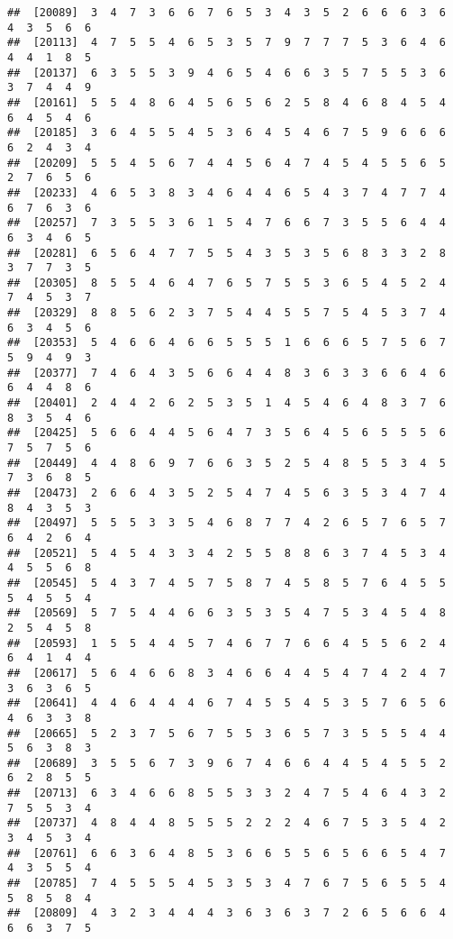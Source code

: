 \documentclass[
]{book}
\begin{document}
\begin{verbatim}
##  [20089]  3  4  7  3  6  6  7  6  5  3  4  3  5  2  6  6  6  3  6  4  3  5  6  6
##  [20113]  4  7  5  5  4  6  5  3  5  7  9  7  7  7  5  3  6  4  6  4  4  1  8  5
##  [20137]  6  3  5  5  3  9  4  6  5  4  6  6  3  5  7  5  5  3  6  3  7  4  4  9
##  [20161]  5  5  4  8  6  4  5  6  5  6  2  5  8  4  6  8  4  5  4  6  4  5  4  6
##  [20185]  3  6  4  5  5  4  5  3  6  4  5  4  6  7  5  9  6  6  6  6  2  4  3  4
##  [20209]  5  5  4  5  6  7  4  4  5  6  4  7  4  5  4  5  5  6  5  2  7  6  5  6
##  [20233]  4  6  5  3  8  3  4  6  4  4  6  5  4  3  7  4  7  7  4  6  7  6  3  6
##  [20257]  7  3  5  5  3  6  1  5  4  7  6  6  7  3  5  5  6  4  4  6  3  4  6  5
##  [20281]  6  5  6  4  7  7  5  5  4  3  5  3  5  6  8  3  3  2  8  3  7  7  3  5
##  [20305]  8  5  5  4  6  4  7  6  5  7  5  5  3  6  5  4  5  2  4  7  4  5  3  7
##  [20329]  8  8  5  6  2  3  7  5  4  4  5  5  7  5  4  5  3  7  4  6  3  4  5  6
##  [20353]  5  4  6  6  4  6  6  5  5  5  1  6  6  6  5  7  5  6  7  5  9  4  9  3
##  [20377]  7  4  6  4  3  5  6  6  4  4  8  3  6  3  3  6  6  4  6  6  4  4  8  6
##  [20401]  2  4  4  2  6  2  5  3  5  1  4  5  4  6  4  8  3  7  6  8  3  5  4  6
##  [20425]  5  6  6  4  4  5  6  4  7  3  5  6  4  5  6  5  5  5  6  7  5  7  5  6
##  [20449]  4  4  8  6  9  7  6  6  3  5  2  5  4  8  5  5  3  4  5  7  3  6  8  5
##  [20473]  2  6  6  4  3  5  2  5  4  7  4  5  6  3  5  3  4  7  4  8  4  3  5  3
##  [20497]  5  5  5  3  3  5  4  6  8  7  7  4  2  6  5  7  6  5  7  6  4  2  6  4
##  [20521]  5  4  5  4  3  3  4  2  5  5  8  8  6  3  7  4  5  3  4  4  5  5  6  8
##  [20545]  5  4  3  7  4  5  7  5  8  7  4  5  8  5  7  6  4  5  5  5  4  5  5  4
##  [20569]  5  7  5  4  4  6  6  3  5  3  5  4  7  5  3  4  5  4  8  2  5  4  5  8
##  [20593]  1  5  5  4  4  5  7  4  6  7  7  6  6  4  5  5  6  2  4  6  4  1  4  4
##  [20617]  5  6  4  6  6  8  3  4  6  6  4  4  5  4  7  4  2  4  7  3  6  3  6  5
##  [20641]  4  4  6  4  4  4  6  7  4  5  5  4  5  3  5  7  6  5  6  4  6  3  3  8
##  [20665]  5  2  3  7  5  6  7  5  5  3  6  5  7  3  5  5  5  4  4  5  6  3  8  3
##  [20689]  3  5  5  6  7  3  9  6  7  4  6  6  4  4  5  4  5  5  2  6  2  8  5  5
##  [20713]  6  3  4  6  6  8  5  5  3  3  2  4  7  5  4  6  4  3  2  7  5  5  3  4
##  [20737]  4  8  4  4  8  5  5  5  2  2  2  4  6  7  5  3  5  4  2  3  4  5  3  4
##  [20761]  6  6  3  6  4  8  5  3  6  6  5  5  6  5  6  6  5  4  7  4  3  5  5  4
##  [20785]  7  4  5  5  5  4  5  3  5  3  4  7  6  7  5  6  5  5  4  5  8  5  8  4
##  [20809]  4  3  2  3  4  4  4  3  6  3  6  3  7  2  6  5  6  6  4  6  6  3  7  5

\end{verbatim}
\end{document}
